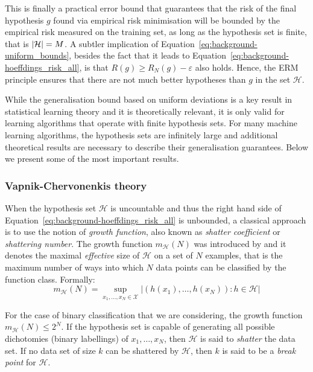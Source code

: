 {This is finally a practical error bound that guarantees that the risk of the final hypothesis $g$ found via empirical risk minimisation will be bounded by the empirical risk measured on the training set, as long as the hypothesis set is finite, that is $\lvert\mathcal{H}\rvert = M$. A subtler implication of Equation~\ref{eq:background-uniform_bounds}, besides the fact that it leads to Equation~\ref{eq:background-hoeffdings_risk_all}, is that $R(g) \geq R_{N}(g) - \varepsilon$ also holds. Hence, the ERM principle ensures that there are not much better hypotheses than $g$ in the set $\mathcal{H}$.

While the generalisation bound based on uniform deviations is a key result in statistical learning theory and it is theoretically relevant, it is only valid for learning algorithms that operate with finite hypothesis sets. For many machine learning algorithms, the hypothesis sets are infinitely large and additional theoretical results are necessary to describe their generalisation guarantees. Below we present some of the most important results.

\subsubsection{Vapnik-Chervonenkis theory}
When the hypothesis set $\mathcal{H}$ is uncountable and thus the right hand side of Equation~\ref{eq:background-hoeffdings_risk_all} is unbounded, a classical approach is to use the notion of \textit{growth function}, also known as \textit{shatter coefficient} or \textit{shattering number}. The growth function $m_{\mathcal{H}}(N)$ was introduced by \citet{vapnik1971vc} and it denotes the maximal \textit{effective} size of $\mathcal{H}$ on a set of $N$ examples, that is the maximum number of ways into which $N$ data points can be classified by the function class. Formally: 
%
\begin{equation}
\label{eq:background-growth_function}
    m_{\mathcal{H}}(N) = \sup_{x_1, \ldots, x_N \in \mathcal{X}}\left| (h(x_1), \ldots, h(x_N)) : h \in \mathcal{H} \right|
\end{equation}

For the case of binary classification that we are considering, the growth function $m_{\mathcal{H}}(N) \leq 2^N$. If the hypothesis set is capable of generating all possible dichotomies (binary labellings) of $x_1, \ldots, x_N$, then $\mathcal{H}$ is said to \textit{shatter} the data set. If no data set of size $k$ can be shattered by $\mathcal{H}$, then $k$ is said to be a \textit{break point} for $\mathcal{H}$. 

}
